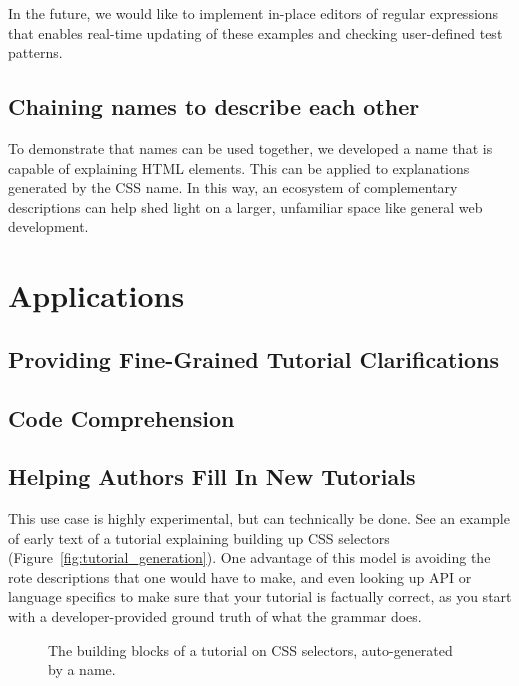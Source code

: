 In the future, we would like to implement in-place editors of regular expressions that enables real-time updating of these examples and checking user-defined test patterns.

\subsection{Chaining \glspl{name} to describe each other}

To demonstrate that \glspl{name} can be used together, we developed a \gls{name} that is capable of explaining HTML elements.
This can be applied to explanations generated by the CSS \gls{name}.
In this way, an ecosystem of complementary descriptions can help shed light on a larger, unfamiliar space like general web development.

\section{Applications}

\subsection{Providing Fine-Grained Tutorial Clarifications}

\subsection{Code Comprehension}

\subsection{Helping Authors Fill In New Tutorials}

This use case is highly experimental, but can technically be done.
See an example of early text of a tutorial explaining building up CSS selectors (Figure~\ref{fig:tutorial_generation}).
One advantage of this model is avoiding the rote descriptions that one would have to make, and even looking up API or language specifics to make sure that your tutorial is factually correct, as you start with a developer-provided ground truth of what the grammar does.

\begin{figure}
\caption{The building blocks of a tutorial on CSS selectors, auto-generated by a \gls{name}.}
\end{figure}
